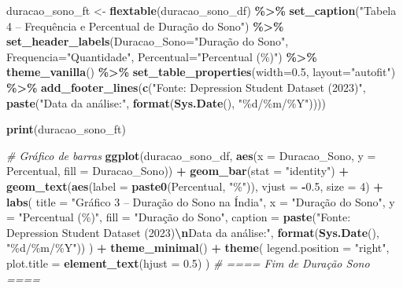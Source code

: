 \documentclass[
]{article}
\newenvironment{Shaded}{\begin{snugshade}}{\end{snugshade}}
\newcommand{\AttributeTok}[1]{\textcolor[rgb]{0.13,0.29,0.53}{#1}}
\newcommand{\CommentTok}[1]{\textcolor[rgb]{0.56,0.35,0.01}{\textit{#1}}}
\newcommand{\DecValTok}[1]{\textcolor[rgb]{0.00,0.00,0.81}{#1}}
\newcommand{\FloatTok}[1]{\textcolor[rgb]{0.00,0.00,0.81}{#1}}
\newcommand{\FunctionTok}[1]{\textcolor[rgb]{0.13,0.29,0.53}{\textbf{#1}}}
\newcommand{\NormalTok}[1]{#1}
\newcommand{\OtherTok}[1]{\textcolor[rgb]{0.56,0.35,0.01}{#1}}
\newcommand{\SpecialCharTok}[1]{\textcolor[rgb]{0.81,0.36,0.00}{\textbf{#1}}}
\newcommand{\StringTok}[1]{\textcolor[rgb]{0.31,0.60,0.02}{#1}}
\begin{document}
\begin{Shaded}
\begin{Highlighting}[]
\NormalTok{duracao\_sono\_ft }\OtherTok{\textless{}{-}} \FunctionTok{flextable}\NormalTok{(duracao\_sono\_df) }\SpecialCharTok{\%\textgreater{}\%}
  \FunctionTok{set\_caption}\NormalTok{(}\StringTok{"Tabela 4 – Frequência e Percentual de Duração do Sono"}\NormalTok{) }\SpecialCharTok{\%\textgreater{}\%}
  \FunctionTok{set\_header\_labels}\NormalTok{(}\AttributeTok{Duracao\_Sono=}\StringTok{"Duração do Sono"}\NormalTok{, }\AttributeTok{Frequencia=}\StringTok{"Quantidade"}\NormalTok{, }\AttributeTok{Percentual=}\StringTok{"Percentual (\%)"}\NormalTok{) }\SpecialCharTok{\%\textgreater{}\%}
  \FunctionTok{theme\_vanilla}\NormalTok{() }\SpecialCharTok{\%\textgreater{}\%}
  \FunctionTok{set\_table\_properties}\NormalTok{(}\AttributeTok{width=}\FloatTok{0.5}\NormalTok{, }\AttributeTok{layout=}\StringTok{"autofit"}\NormalTok{) }\SpecialCharTok{\%\textgreater{}\%}
  \FunctionTok{add\_footer\_lines}\NormalTok{(}\FunctionTok{c}\NormalTok{(}\StringTok{"Fonte: Depression Student Dataset (2023)"}\NormalTok{, }\FunctionTok{paste}\NormalTok{(}\StringTok{"Data da análise:"}\NormalTok{, }\FunctionTok{format}\NormalTok{(}\FunctionTok{Sys.Date}\NormalTok{(), }\StringTok{"\%d/\%m/\%Y"}\NormalTok{))))}

\FunctionTok{print}\NormalTok{(duracao\_sono\_ft)}

\CommentTok{\# Gráfico de barras}
\FunctionTok{ggplot}\NormalTok{(duracao\_sono\_df, }\FunctionTok{aes}\NormalTok{(}\AttributeTok{x =}\NormalTok{ Duracao\_Sono, }\AttributeTok{y =}\NormalTok{ Percentual, }\AttributeTok{fill =}\NormalTok{ Duracao\_Sono)) }\SpecialCharTok{+}
  \FunctionTok{geom\_bar}\NormalTok{(}\AttributeTok{stat =} \StringTok{"identity"}\NormalTok{) }\SpecialCharTok{+}
  \FunctionTok{geom\_text}\NormalTok{(}\FunctionTok{aes}\NormalTok{(}\AttributeTok{label =} \FunctionTok{paste0}\NormalTok{(Percentual, }\StringTok{"\%"}\NormalTok{)), }\AttributeTok{vjust =} \SpecialCharTok{{-}}\FloatTok{0.5}\NormalTok{, }\AttributeTok{size =} \DecValTok{4}\NormalTok{) }\SpecialCharTok{+}
  \FunctionTok{labs}\NormalTok{(}
    \AttributeTok{title =} \StringTok{"Gráfico 3 – Duração do Sono na Índia"}\NormalTok{,}
    \AttributeTok{x =} \StringTok{"Duração do Sono"}\NormalTok{,}
    \AttributeTok{y =} \StringTok{"Percentual (\%)"}\NormalTok{,}
    \AttributeTok{fill =} \StringTok{"Duração do Sono"}\NormalTok{,}
    \AttributeTok{caption =} \FunctionTok{paste}\NormalTok{(}\StringTok{"Fonte: Depression Student Dataset (2023)}\SpecialCharTok{\textbackslash{}n}\StringTok{Data da análise:"}\NormalTok{, }\FunctionTok{format}\NormalTok{(}\FunctionTok{Sys.Date}\NormalTok{(), }\StringTok{"\%d/\%m/\%Y"}\NormalTok{))}
\NormalTok{  ) }\SpecialCharTok{+}
  \FunctionTok{theme\_minimal}\NormalTok{() }\SpecialCharTok{+}
  \FunctionTok{theme}\NormalTok{(}
    \AttributeTok{legend.position =} \StringTok{"right"}\NormalTok{,}
    \AttributeTok{plot.title =} \FunctionTok{element\_text}\NormalTok{(}\AttributeTok{hjust =} \FloatTok{0.5}\NormalTok{)}
\NormalTok{  )}
\CommentTok{\# ==== Fim de Duração Sono ====}


\end{Highlighting}
\end{Shaded}
\end{document}
